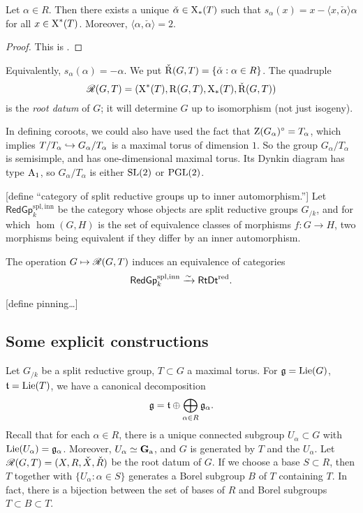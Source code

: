 \begin{theorem}
Let $\alpha\in R$. Then there exists a unique 
$\check\alpha\in \operatorname{X}_\ast(T)$ such that 
$s_\alpha(x) = x-\langle x,\check\alpha\rangle\alpha$ for all 
$x\in \operatorname{X}^\ast(T)$. Moreover, $\langle\alpha,\check\alpha\rangle=2$. 
\end{theorem}
\begin{proof}
This is \cite[XXII 1.1.ii]{sga3-iii}. 
\end{proof}

Equivalently, $s_\alpha(\alpha)=-\alpha$. We put 
$\check{\operatorname{R}}(G,T)=\{\check\alpha:\alpha\in R\}$. The quadruple 
\[
  \mathscr{R}(G,T) = (\operatorname{X}^\ast(T),\operatorname{R}(G,T),\operatorname{X}_\ast(T),\check {\operatorname{R}}(G,T))
\]
is the \emph{root datum} of $G$; it will determine $G$ up to isomorphism (not 
just isogeny). 

In defining coroots, we could also have used the fact that 
$\operatorname{Z}(G_\alpha)^\circ=T_\alpha$, which implies 
$T/T_\alpha\hookrightarrow G_\alpha/T_\alpha$ is a maximal torus of dimension $1$. So 
the group $G_\alpha/T_\alpha$ is semisimple, and has one-dimensional maximal 
torus. Its Dynkin diagram has type $\mathrm{A}_1$, so $G_\alpha/T_\alpha$ is either 
$\operatorname{SL}(2)$ or $\operatorname{PGL}(2)$. 

[define ``category of split reductive groups up to inner automorphism.'']
Let $\mathsf{RedGp}_k^\mathrm{spl,inn}$ be the category whose objects are split 
reductive groups $G_{/k}$, and for which $\hom(G,H)$ is the set of 
equivalence classes of morphisms $f:G\to H$, two morphisms being equivalent if 
they differ by an inner automorphism. 

\begin{theorem}
The operation $G\mapsto \mathscr{R}(G,T)$ induces an equivalence of categories 
\[
  \mathsf{RedGp}_k^\mathrm{spl,inn}\xrightarrow\sim \mathsf{RtDt}^\mathrm{red} .
\]
\end{theorem}

[define pinning\ldots]





\subsection{Some explicit constructions}

Let $G_{/k}$ be a split reductive group, $T\subset G$ a maximal torus. For 
$\mathfrak{g}=\operatorname{Lie}(G)$, $\mathfrak{t}=\operatorname{Lie}(T)$, we have a canonical decomposition 
\[
  \mathfrak{g} = \mathfrak{t}\oplus \bigoplus_{\alpha\in R} \mathfrak{g}_\alpha .
\]
Recall that for each $\alpha\in R$, there is a unique connected subgroup 
$U_\alpha\subset G$ with $\operatorname{Lie}(U_\alpha)=\mathfrak{g}_\alpha$. Moreover, 
$U_\alpha\simeq \mathbf{G}_\mathrm{a}$, and $G$ is generated by $T$ and the $U_\alpha$. 
Let $\mathscr{R}(G,T)=(X,R,\check X,\check R)$ be the root datum of $G$. If we choose 
a base $S\subset R$, then $T$ together with $\{U_\alpha:\alpha\in S\}$ 
generates a Borel subgroup $B$ of $T$ containing $T$. In fact, there is a 
bijection between the set of bases of $R$ and Borel subgroups 
$T\subset B\subset T$. 

